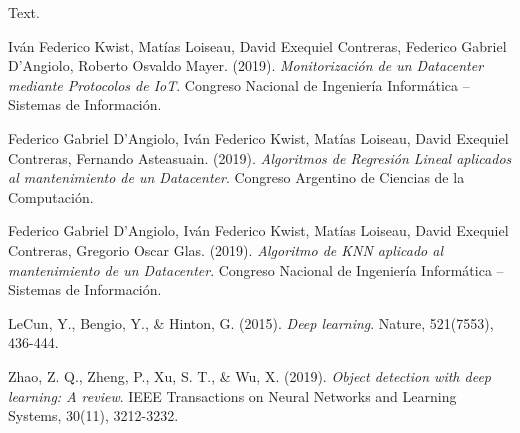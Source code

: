 \documentclass{article} %
\begin{document}
Text.

\clearpage

\begin{thebibliography}{9}

Iván Federico Kwist, Matías Loiseau, David Exequiel Contreras, Federico Gabriel D’Angiolo, Roberto Osvaldo Mayer. (2019). \textit{Monitorización de un Datacenter mediante Protocolos de IoT}. Congreso Nacional de Ingeniería Informática – Sistemas de Información.

Federico Gabriel D’Angiolo, Iván Federico Kwist, Matías Loiseau, David Exequiel Contreras, Fernando Asteasuain. (2019). \textit{Algoritmos de Regresión Lineal aplicados al mantenimiento de un Datacenter}. Congreso Argentino de Ciencias de la Computación.

Federico Gabriel D’Angiolo, Iván Federico Kwist, Matías Loiseau, David Exequiel Contreras, Gregorio Oscar Glas. (2019). \textit{Algoritmo de KNN aplicado al mantenimiento de un Datacenter}. Congreso Nacional de Ingeniería Informática – Sistemas de Información.

LeCun, Y., Bengio, Y., \& Hinton, G. (2015). \textit{Deep learning}. Nature, 521(7553), 436-444.

Zhao, Z. Q., Zheng, P., Xu, S. T., \& Wu, X. (2019). \textit{Object detection with deep learning: A review}. IEEE Transactions on Neural Networks and Learning Systems, 30(11), 3212-3232.

\end{thebibliography}
\end{document}
